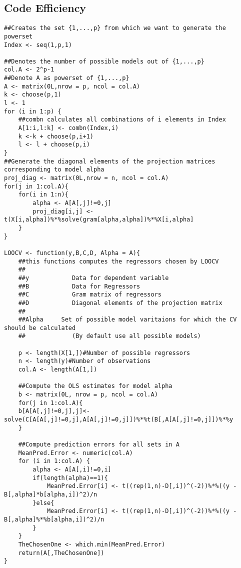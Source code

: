 \documentclass[Research_Module_ES.tex]{subfiles}
\begin{document}
\subsection*{Code Efficiency}

\begin{lstlisting}[title={Leave-one-Out Cross-Validation Function}]
##Creates the set {1,...,p} from which we want to generate the powerset
Index <- seq(1,p,1)    

##Denotes the number of possible models out of {1,...,p}
col.A <- 2^p-1
##Denote A as powerset of {1,...,p}
A <- matrix(0L,nrow = p, ncol = col.A)      
k <- choose(p,1)
l <- 1
for (i in 1:p) {
	##combn calculates all combinations of i elements in Index 
	A[1:i,l:k] <- combn(Index,i)             
	k <-k + choose(p,i+1)
	l <- l + choose(p,i)
}
##Generate the diagonal elements of the projection matrices corresponding to model alpha
proj_diag <- matrix(0L,nrow = n, ncol = col.A)
for(j in 1:col.A){
	for(i in 1:n){
		alpha <- A[A[,j]!=0,j]
		proj_diag[i,j] <- t(X[i,alpha])%*%solve(gram[alpha,alpha])%*%X[i,alpha]
	}
}

LOOCV <- function(y,B,C,D, Alpha = A){
	##this functions computes the regressors chosen by LOOCV
	##
	##y            Data for dependent variable
	##B            Data for Regressors
	##C            Gram matrix of regressors
	##D            Diagonal elements of the projection matrix
	##
	##Alpha     Set of possible model varitaions for which the CV should be calculated 
	##             (By default use all possible models)  

	p <- length(X[1,])#Number of possible regressors
	n <- length(y)#Number of observations
	col.A <- length(A[1,])

	##Compute the OLS estimates for model alpha
	b <- matrix(0L, nrow = p, ncol = col.A)
	for(j in 1:col.A){
	b[A[A[,j]!=0,j],j]<- solve(C[A[A[,j]!=0,j],A[A[,j]!=0,j]])%*%t(B[,A[A[,j]!=0,j]])%*%y
	}

	##Compute prediction errors for all sets in A
	MeanPred.Error <- numeric(col.A)
	for (i in 1:col.A) {
		alpha <- A[A[,i]!=0,i]
		if(length(alpha)==1){
			MeanPred.Error[i] <- t((rep(1,n)-D[,i])^(-2))%*%((y - B[,alpha]*b[alpha,i])^2)/n
		}else{
			MeanPred.Error[i] <- t((rep(1,n)-D[,i])^(-2))%*%((y - B[,alpha]%*%b[alpha,i])^2)/n 
		}
	}
	TheChosenOne <- which.min(MeanPred.Error)
	return(A[,TheChosenOne])
}
\end{lstlisting}
\end{document}

